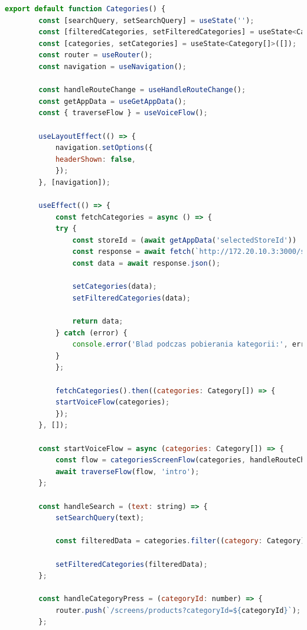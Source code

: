\begin{lstlisting}[language=JavaScript, caption=Ekran kategorii implementacja, label=lst:categories_view]
    export default function Categories() {
        const [searchQuery, setSearchQuery] = useState('');
        const [filteredCategories, setFilteredCategories] = useState<Category[]>([]);
        const [categories, setCategories] = useState<Category[]>([]);
        const router = useRouter();
        const navigation = useNavigation();

        const handleRouteChange = useHandleRouteChange();
        const getAppData = useGetAppData();
        const { traverseFlow } = useVoiceFlow();

        useLayoutEffect(() => {
            navigation.setOptions({
            headerShown: false,
            });
        }, [navigation]);

        useEffect(() => {
            const fetchCategories = async () => {
            try {
                const storeId = (await getAppData('selectedStoreId')) || 1;
                const response = await fetch(`http://172.20.10.3:3000/stores/${storeId}/categories`);
                const data = await response.json();

                setCategories(data);
                setFilteredCategories(data);

                return data;
            } catch (error) {
                console.error('Blad podczas pobierania kategorii:', error);
            }
            };

            fetchCategories().then((categories: Category[]) => {
            startVoiceFlow(categories);
            });
        }, []);

        const startVoiceFlow = async (categories: Category[]) => {
            const flow = categoriesScreenFlow(categories, handleRouteChange, router);
            await traverseFlow(flow, 'intro');
        };

        const handleSearch = (text: string) => {
            setSearchQuery(text);

            const filteredData = categories.filter((category: Category) => category.category_name.toLowerCase().includes(text.toLowerCase()));

            setFilteredCategories(filteredData);
        };

        const handleCategoryPress = (categoryId: number) => {
            router.push(`/screens/products?categoryId=${categoryId}`);
        };


\end{lstlisting}
